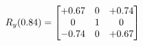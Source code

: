 \documentclass[preview]{standalone}
\begin{document}
\begin{align*}
\special{dvisvgm:raw <g id='unique000'>}R_{y}(0.84) = \begin{bmatrix}+0.67 & 0 & +0.74 \\0 & 1 & 0 \\-0.74 & 0 & +0.67\end{bmatrix}\special{dvisvgm:raw </g>}
\end{align*}
\end{document}
